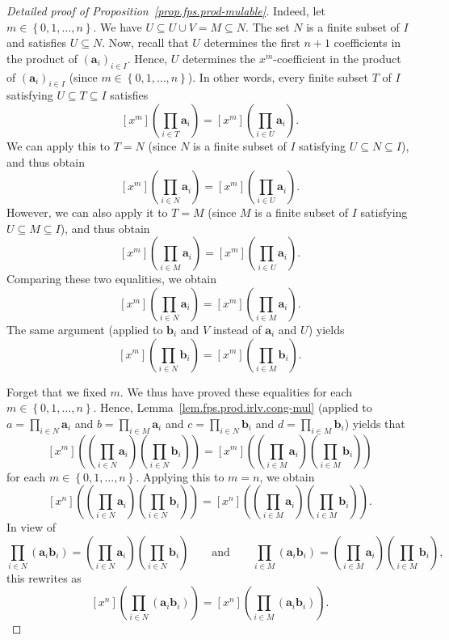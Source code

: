 \begin{proof}[Detailed proof of Proposition~\ref{prop.fps.prod-mulable}]
Indeed, let $m \in \left\{0, 1, \ldots, n\right\}$. We have
$U \subseteq U \cup V = M \subseteq N$. The set $N$ is a finite subset
of $I$ and satisfies $U \subseteq N$. Now, recall that $U$ determines
the first $n+1$ coefficients in the product of
$\left(\mathbf{a}_{i}\right)_{i \in I}$. Hence, $U$ determines the
$x^m$-coefficient in the product of
$\left(\mathbf{a}_{i}\right)_{i \in I}$ (since
$m \in \left\{0, 1, \ldots, n\right\}$). In other words, every finite
subset $T$ of $I$ satisfying $U \subseteq T \subseteq I$ satisfies
\[
\left[x^{m}\right] \left(\prod_{i \in T} \mathbf{a}_{i}\right)
= \left[x^{m}\right] \left(\prod_{i \in U} \mathbf{a}_{i}\right).
\]
We can apply this to $T = N$ (since $N$ is a finite subset of $I$
satisfying $U \subseteq N \subseteq I$), and thus obtain
\[
\left[x^{m}\right] \left(\prod_{i \in N} \mathbf{a}_{i}\right)
= \left[x^{m}\right] \left(\prod_{i \in U} \mathbf{a}_{i}\right).
\]
However, we can also apply it to $T = M$ (since $M$ is a finite subset
of $I$ satisfying $U \subseteq M \subseteq I$), and thus obtain
\[
\left[x^{m}\right] \left(\prod_{i \in M} \mathbf{a}_{i}\right)
= \left[x^{m}\right] \left(\prod_{i \in U} \mathbf{a}_{i}\right).
\]
Comparing these two equalities, we obtain
\[
\left[x^{m}\right] \left(\prod_{i \in N} \mathbf{a}_{i}\right)
= \left[x^{m}\right] \left(\prod_{i \in M} \mathbf{a}_{i}\right).
\]
The same argument (applied to $\mathbf{b}_{i}$ and $V$ instead of
$\mathbf{a}_{i}$ and $U$) yields
\[
\left[x^{m}\right] \left(\prod_{i \in N} \mathbf{b}_{i}\right)
= \left[x^{m}\right] \left(\prod_{i \in M} \mathbf{b}_{i}\right).
\]

Forget that we fixed $m$. We thus have proved these equalities for each
$m \in \left\{0, 1, \ldots, n\right\}$. Hence,
Lemma~\ref{lem.fps.prod.irlv.cong-mul} (applied to
$a = \prod_{i \in N} \mathbf{a}_{i}$ and
$b = \prod_{i \in M} \mathbf{a}_{i}$ and
$c = \prod_{i \in N} \mathbf{b}_{i}$ and
$d = \prod_{i \in M} \mathbf{b}_{i}$) yields that
\[
\left[x^{m}\right] \left(
  \left(\prod_{i \in N} \mathbf{a}_{i}\right)
  \left(\prod_{i \in N} \mathbf{b}_{i}\right)\right)
= \left[x^{m}\right] \left(
  \left(\prod_{i \in M} \mathbf{a}_{i}\right)
  \left(\prod_{i \in M} \mathbf{b}_{i}\right)\right)
\]
for each $m \in \left\{0, 1, \ldots, n\right\}$. Applying this to
$m = n$, we obtain
\[
\left[x^{n}\right] \left(
  \left(\prod_{i \in N} \mathbf{a}_{i}\right)
  \left(\prod_{i \in N} \mathbf{b}_{i}\right)\right)
= \left[x^{n}\right] \left(
  \left(\prod_{i \in M} \mathbf{a}_{i}\right)
  \left(\prod_{i \in M} \mathbf{b}_{i}\right)\right).
\]
In view of
\[
\prod_{i \in N} \left(\mathbf{a}_{i} \mathbf{b}_{i}\right)
= \left(\prod_{i \in N} \mathbf{a}_{i}\right)
  \left(\prod_{i \in N} \mathbf{b}_{i}\right)
\qquad \text{and} \qquad
\prod_{i \in M} \left(\mathbf{a}_{i} \mathbf{b}_{i}\right)
= \left(\prod_{i \in M} \mathbf{a}_{i}\right)
  \left(\prod_{i \in M} \mathbf{b}_{i}\right),
\]
this rewrites as
\[
\left[x^{n}\right] \left(\prod_{i \in N}
  \left(\mathbf{a}_{i} \mathbf{b}_{i}\right)\right)
= \left[x^{n}\right] \left(\prod_{i \in M}
  \left(\mathbf{a}_{i} \mathbf{b}_{i}\right)\right).
\]


\end{proof}
